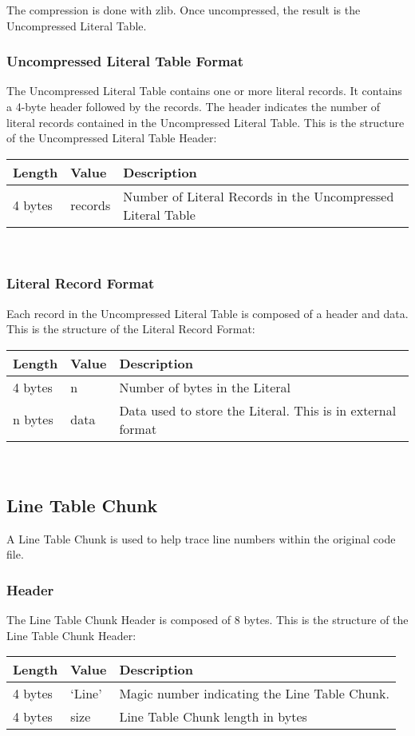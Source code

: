 \documentclass{article}
\begin{document}
The compression is done with zlib.  Once uncompressed, the result is the Uncompressed
Literal Table.

\subsubsection{Uncompressed Literal Table Format}
The Uncompressed Literal Table contains one or more literal records.
It contains a 4-byte header followed by the records.
The header indicates the number of literal records contained in the Uncompressed Literal Table.
This is the structure of the Uncompressed Literal Table Header:\\
\begin{tabular}{ |l|l|p{3in}| } \hline
Length  & Value  & Description\\ \hline
4 bytes & records & Number of Literal Records in the Uncompressed Literal Table\\ \hline
\end{tabular}\\

\subsubsection{Literal Record Format}
Each record in the Uncompressed Literal Table is composed of a header and data.
This is the structure of the Literal Record Format:\\
\begin{tabular}{ |l|l|p{3in}| } \hline
Length  & Value  & Description\\ \hline
4 bytes & n & Number of bytes in the Literal\\ \hline
n bytes & data & Data used to store the Literal.  This is in external format\\ \hline
\end{tabular}\\

\subsection{Line Table Chunk}
A Line Table Chunk is used to help trace line numbers within the original code file.

\subsubsection{Header}
The Line Table Chunk Header is composed of 8 bytes.
This is the structure of the Line Table Chunk Header:\\
\begin{tabular}{ |l|l|p{3in}| } \hline
Length  & Value  & Description\\ \hline
4 bytes & `Line' & Magic number indicating the Line Table Chunk.\\ \hline
4 bytes & size & Line Table Chunk length in bytes\\ \hline
\end{tabular}\\
\end{document}
